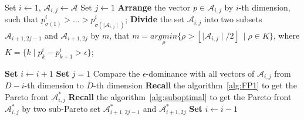 \begin{algo}
\label{alg:general}
\begin{algorithmic}
\REQUIRE Set $i\leftarrow 1$, $\mathscr{A}_{i,j}\leftarrow \mathscr{A}$
\STATE	Set $j\leftarrow 1$
\STATE 	\textbf{Arrange} the vector $p\in \mathscr{A}_{i,j}$ by $i$-th dimension, 
such that $p_{\sigma(1)}^i>\dots>p_{\sigma(\mid\mathscr{A}_{i,j}\mid)}^i$;
\STATE 	\textbf{Divide} the set $\mathscr{A}_{i,j}$ into two subsets $\mathscr{A}_{i+1,2j-1}$ and $\mathscr{A}_{i+1,2j}$ by $m$, that $m = \underset{\rho}{argmin}\{\rho>\left \lfloor \mid \mathscr{A}_{i,j}\mid/2 \right \rfloor\ \mid \rho\in K\}$, where $K = \{k\mid p_{k}^i-p_{k+1}^i >\epsilon\}$;

\ENDFOR
\STATE \textbf{Set} $i\leftarrow i+1$
\ENDFOR
{}
\STATE	\textbf{Set} $j=1$
\STATE	Compare the $\epsilon$-dominance with all vectors of $\mathscr{A}_{i,j} $ from $D-i$-th dimension to $D$-th dimension
\STATE	\textbf{Recall} the algorithm~\ref{alg:FP1} to get the Pareto front $\mathscr{A}_{i,j}^{\ast}$
\ELSE
\STATE	\textbf{Recall} the algorithm~\ref{alg:suboptimal} to get the Pareto front $\mathscr{A}_{i,j}^{\ast}$ by two sub-Pareto set $\mathscr{A}_{i+1,2j-1}^{\ast}$ and $\mathscr{A}_{i+1,2j}^{\ast}$ 
\ENDIF
\STATE	\textbf{Set} $i\leftarrow i-1$
\ENDFOR
\ENDFOR
\end{algorithmic}
\end{algo}
